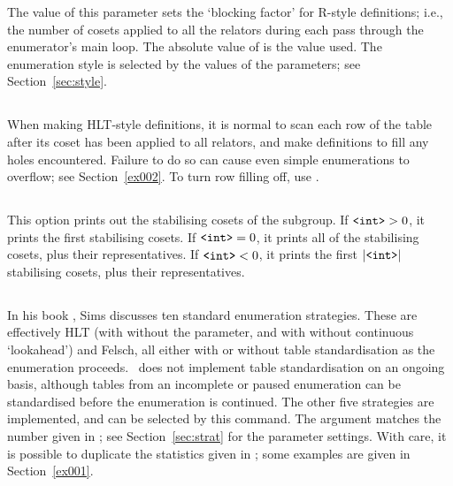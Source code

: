 The value of this parameter sets the `blocking factor' for R-style
  definitions; i.e., the number of cosets applied to all the relators
  during each pass through the enumerator's main loop.
The absolute value of  is the value used.
The enumeration style is selected by the values of the  \amp
   parameters; see Section~\ref{sec:style}.

\subsection{}

When making HLT-style definitions, it is normal to scan each row of the
  table after its coset has been applied to all relators, and make 
  definitions to fill any holes encountered.
Failure to do so can cause even simple enumerations to overflow; see
  Section~\ref{ex002}.
To turn row filling off, use .
  
\subsection{}

This option prints out the stabilising cosets of the subgroup.
If $\texttt{<int>} > 0$, it prints the first  stabilising cosets.
If $\texttt{<int>} = 0$, it prints all of the stabilising cosets, plus their
  representatives.
If $\texttt{<int>} < 0$, it prints the first $|\texttt{<int>}|$ stabilising cosets,
  plus their representatives.

\subsection{}

In his book \cite{Sim94}, Sims discusses ten standard enumeration
  strategies.
These are effectively HLT (with \amp without the  parameter,
  and with \amp without continuous `lookahead') and Felsch, all either with
  or without table standardisation as the enumeration proceeds.
\ace\ does not implement table standardisation on an ongoing basis, 
  although tables from an incomplete or paused enumeration can be 
  standardised before the enumeration is continued.
The other five strategies are implemented, and can be selected by this
  command.
The argument matches the number given in \cite[\S5.5]{Sim94}; see
  Section~\ref{sec:strat} for the parameter settings.
With care, it is possible to duplicate the statistics given in \cite{Sim94};
  some examples are given in Section~\ref{ex001}.

